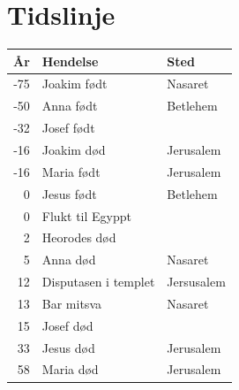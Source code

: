 
\chapter{Tidslinje}

\begin{tabular}{|rll|}
  \hline
  \textbf{År}          & \textbf{Hendelse} & \textbf{Sted} \\ \hline
-75   & Joakim født & Nasaret \\
-50   &  Anna  født & Betlehem \\
-32   & Josef født  &    \\
-16   & Joakim død  &  Jerusalem\\
-16   & Maria født  & Jerusalem \\
0   & Jesus født  & Betlehem \\
0   & Flukt til Egyppt &     \\
2    & Heorodes død &         \\
  5   &   Anna død  &   Nasaret \\
  12  & Disputasen i  templet & Jersusalem \\
  13  &  Bar mitsva & Nasaret \\
  15   & Josef død   &         \\
 33   & Jesus død   & Jerusalem \\
 58   &   Maria død & Jerusalem \\
 \hline
  \end{tabular}
